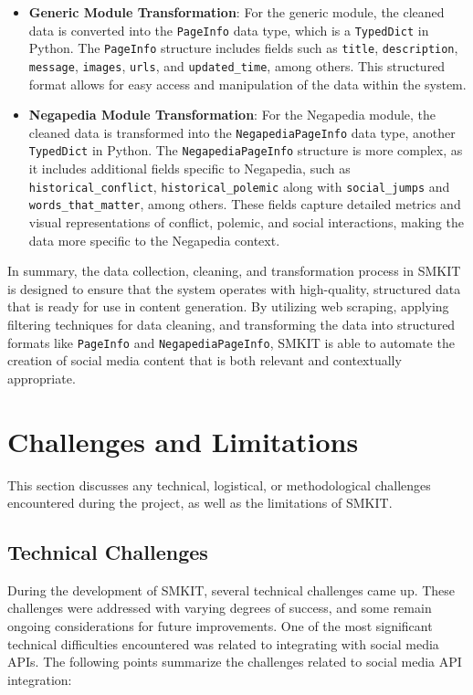 \begin{itemize}
    \item \textbf{Generic Module Transformation}: For the generic module, the cleaned data is converted into the \texttt{PageInfo} data type, which is a \texttt{TypedDict} in Python. The \texttt{PageInfo} structure includes fields such as \texttt{title}, \texttt{description}, \texttt{message}, \texttt{images}, \texttt{urls}, and \texttt{updated\_time}, among others. This structured format allows for easy access and manipulation of the data within the system.
    \item \textbf{Negapedia Module Transformation}: For the Negapedia module, the cleaned data is transformed into the \texttt{NegapediaPageInfo} data type, another \texttt{TypedDict} in Python. The \texttt{NegapediaPageInfo} structure is more complex, as it includes additional fields specific to Negapedia, such as \texttt{historical\_conflict}, \texttt{historical\_polemic} along with \texttt{social\_jumps} and \texttt{words\_that\_matter}, among others. These fields capture detailed metrics and visual representations of conflict, polemic, and social interactions, making the data more specific to the Negapedia context.
\end{itemize}

In summary, the data collection, cleaning, and transformation process in SMKIT is designed to ensure that the system operates with high-quality, structured data that is ready for use in content generation. By utilizing web scraping, applying filtering techniques for data cleaning, and transforming the data into structured formats like \texttt{PageInfo} and \texttt{NegapediaPageInfo}, SMKIT is able to automate the creation of social media content that is both relevant and contextually appropriate.


\section{Challenges and Limitations}
\label{sec:challenges_limitations}
This section discusses any technical, logistical, or methodological challenges encountered during the project, as well as the limitations of SMKIT.

\subsection{Technical Challenges}
\label{subsec:technical_challenges}
During the development of SMKIT, several technical challenges came up. These challenges were addressed with varying degrees of success, and some remain ongoing considerations for future improvements. One of the most significant technical difficulties encountered was related to integrating with social media APIs. The following points summarize the challenges related to social media API integration:

